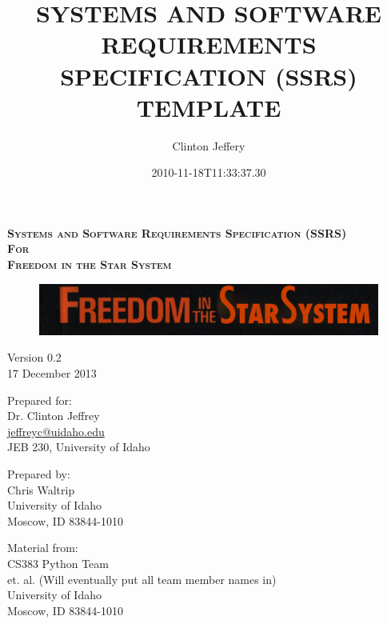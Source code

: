 \documentclass[twoside,letterpaper]{article}
\title{SYSTEMS AND SOFTWARE REQUIREMENTS SPECIFICATION (SSRS) TEMPLATE}
\author{Clinton Jeffery}
\date{2010-11-18T11:33:37.30}
\begin{document}
\setlength{\aboverulesep}{0pt}
\setlength{\belowrulesep}{0pt}
\setlength{\extrarowheight}{.75ex}

\begin{minipage}{\linewidth}
\centering
\textsc{
	\textbf{
		Systems and Software Requirements Specification (SSRS) 	\\
							For								   	\\
							\vspace{1em}
						{\Large Freedom in the Star System}		\\
}}
\end{minipage}

\vspace{2em}

\begin{figure}[h]
\centering
\includegraphics[scale=0.8]{./images/fitss.png}
\end{figure}

\begin{minipage}{\linewidth}
\centering
Version 0.2\\
17 December 2013\\

\vspace{2em}

Prepared for:\\
Dr. Clinton Jeffrey\\
\url{jeffreyc@uidaho.edu}\\
JEB 230, University of Idaho

\vspace{2em}

Prepared by:\\
Chris Waltrip\\
University of Idaho\\
Moscow, ID 83844-1010

\vspace{2em}

Material from:\\
CS383 Python Team\\
et. al. (Will eventually put all team member names in)\\
University of Idaho\\
Moscow, ID 83844-1010
\end{minipage}
\end{document}
